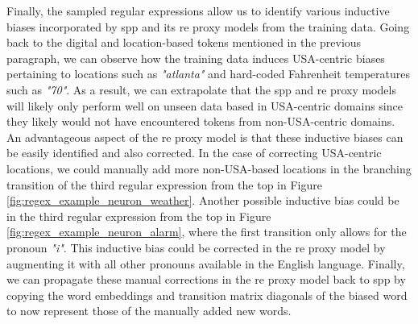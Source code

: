 Finally, the sampled regular expressions allow us to identify various inductive
biases incorporated by \ac{spp} and its \ac{re} proxy models from the training data.
Going back to the digital and location-based tokens mentioned in the previous
paragraph, we can observe how the training data induces USA-centric biases
pertaining to locations such as \textit{"atlanta"} and hard-coded Fahrenheit
temperatures such as \textit{"70"}. As a result, we can extrapolate that the
\ac{spp} and \ac{re} proxy models will likely only perform well on unseen data based in
USA-centric domains since they likely would not have encountered tokens from
non-USA-centric domains. An advantageous aspect of the \ac{re} proxy model is that
these inductive biases can be easily identified and also corrected. In the case
of correcting USA-centric locations, we could manually add more non-USA-based
locations in the branching transition of the third regular expression from the
top in Figure \ref{fig:regex_example_neuron_weather}. Another possible inductive
bias could be in the third regular expression from the top in Figure
\ref{fig:regex_example_neuron_alarm}, where the first transition only allows for
the pronoun \textit{"i"}. This inductive bias could be corrected in the \ac{re} proxy
model by augmenting it with all other pronouns available in the English
language. Finally, we can propagate these manual corrections in the \ac{re} proxy
model back to \ac{spp} by copying the word embeddings and transition matrix
diagonals of the biased word to now represent those of the manually added new
words.



